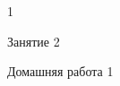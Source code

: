 
\begin{class}[number=1]
	\begin{listofex}
		\item 1
		
	\end{listofex}
\end{class}

\begin{class}[number=2]
	\begin{listofex}
		\item Занятие 2
	\end{listofex}
\end{class}

\begin{homework}[number=1]
	\begin{listofex}
		\item Домашняя работа 1
	\end{listofex}
\end{homework}

